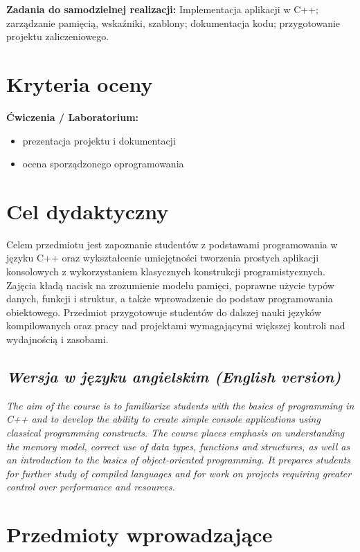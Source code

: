 \documentclass[12pt, a4paper]{article}
\begin{document}
\vspace{4pt}
\noindent\textbf{Zadania do samodzielnej realizacji:} Implementacja aplikacji w C++; zarządzanie pamięcią, wskaźniki, szablony; dokumentacja kodu; przygotowanie projektu zaliczeniowego.

\section{Kryteria oceny}

\textbf{Ćwiczenia / Laboratorium:}
\begin{itemize}
  \item prezentacja projektu i dokumentacji
  \item ocena sporządzonego oprogramowania
\end{itemize}


\section{Cel dydaktyczny}

Celem przedmiotu jest zapoznanie studentów z podstawami programowania w języku C++ oraz wykształcenie umiejętności tworzenia prostych aplikacji konsolowych z wykorzystaniem klasycznych konstrukcji programistycznych. Zajęcia kładą nacisk na zrozumienie modelu pamięci, poprawne użycie typów danych, funkcji i struktur, a także wprowadzenie do podstaw programowania obiektowego. Przedmiot przygotowuje studentów do dalszej nauki języków kompilowanych oraz pracy nad projektami wymagającymi większej kontroli nad wydajnością i zasobami.

\subsection*{\textit{Wersja w języku angielskim (English version)}}

\textit{The aim of the course is to familiarize students with the basics of programming in C++ and to develop the ability to create simple console applications using classical programming constructs. The course places emphasis on understanding the memory model, correct use of data types, functions and structures, as well as an introduction to the basics of object-oriented programming. It prepares students for further study of compiled languages and for work on projects requiring greater control over performance and resources.}


\section{Przedmioty wprowadzające}
\end{document}

